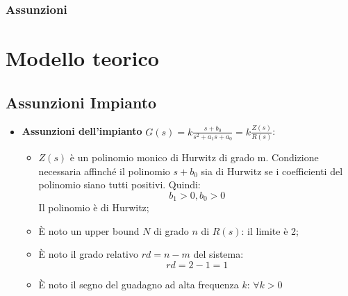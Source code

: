 \documentclass{beamer}
\begin{document}
\begin{frame}
	\frametitle{Assunzioni}%
	\section{Modello teorico}
	\subsection{Assunzioni Impianto}
    \begin{itemize}
        \item \textbf{Assunzioni dell'impianto} \(G(s)=k\frac{s+b_{0}}{s^{2}+a_{1}s+a_{0}}=k\frac{Z(s)}{R(s)}\):
        \begin{itemize}
            \item \(Z(s)\) è un polinomio monico di Hurwitz di grado m.
            Condizione necessaria affinché il polinomio \(s+b_{0}\) sia di Hurwitz se i coefficienti del polinomio siano tutti positivi. Quindi:\begin{equation}
                b_{1}>0, b_{0}>0
            \end{equation}
            Il polinomio è di Hurwitz;
            \item È noto un upper bound \(N\) di grado \(n\) di \(R(s)\): il limite è 2;
            \item È noto il grado relativo \(rd=n-m\) del sistema:\begin{equation}
                rd = 2- 1=1
            \end{equation}
            \item È noto il segno del guadagno ad alta frequenza \(k\): \(\forall k>0\)
        \end{itemize}
    \end{itemize}
\end{frame}
\end{document}
